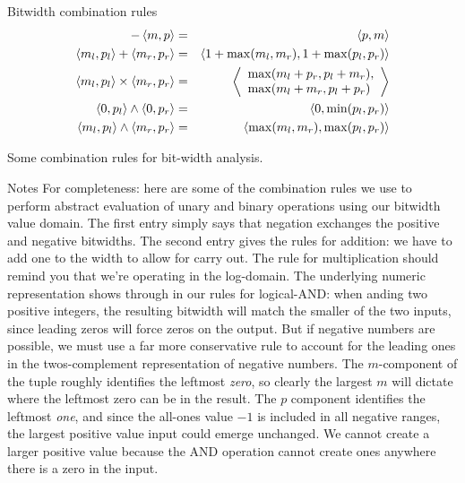\documentclass[%
pdf,
colorBG,
slideColor,
nototal,
oqe
]{prosper}
\newenvironment{talknotes}{\begin{slide}{Notes}\tiny}{\end{slide}}
\begin{document}
\begin{slide}{Bitwidth combination rules}
\begin{eqnarray*}
-\left\langle m,p \right\rangle &=& \left\langle p,m \right\rangle\\
\left\langle m_l,p_l \right\rangle + \left\langle m_r,p_r \right\rangle &=& \left\langle 1+\max(m_l,m_r),1+\max(p_l,p_r) \right\rangle\\
\left\langle m_l,p_l \right\rangle \times \left\langle m_r,p_r \right\rangle &=&
\left\langle \begin{array}{l}\max(m_l+p_r,p_l+m_r),\\
                       \max(m_l+m_r,p_l+p_r)\end{array} \right\rangle\\
\left\langle 0,p_l \right\rangle \wedge \left\langle 0,p_r \right\rangle &=& \left\langle 0,\min(p_l,p_r) \right\rangle\\
\left\langle m_l,p_l \right\rangle\wedge \left\langle m_r,p_r \right\rangle &=& \left\langle \max(m_l,m_r),\max(p_l,p_r) \right\rangle
\end{eqnarray*}

Some combination rules for bit-width analysis.
\end{slide}

\begin{talknotes}
For completeness: here are some of the combination rules we use to
perform abstract evaluation of unary and binary operations using
our bitwidth value domain.  The first entry simply says that negation
exchanges the positive and negative bitwidths.  The second entry gives
the rules for addition: we have to add one to the width to allow for
carry out.  The rule for multiplication should remind you that we're
operating in the log-domain.  The underlying numeric representation
shows through in our rules for logical-AND: when anding two positive
integers, the resulting bitwidth will match the smaller of the two
inputs, since leading zeros will force zeros on the output.  But
if negative numbers are possible, we must use a far more conservative
rule to account for the leading ones in the twos-complement
representation of negative numbers.  The $m$-component of the tuple
roughly identifies the leftmost \emph{zero}, so clearly the largest
$m$ will dictate where the leftmost zero can be in the result.
The $p$ component identifies the leftmost \emph{one}, and since
the all-ones value $-1$ is included in all negative ranges, the
largest positive value input could emerge unchanged.  We cannot create
a larger positive value because the AND operation cannot create ones
anywhere there is a zero in the input.

~%
\end{talknotes}
\end{document}
